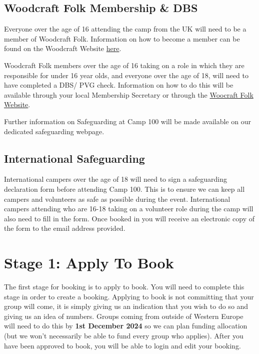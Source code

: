 \documentclass[a4paper, 11pt]{report}
\begin{document}
\section{Woodcraft Folk Membership \& DBS}
Everyone over the age of 16 attending the camp from the UK will need to be a member of Woodcraft Folk. Information on how to become a member can be found on the Woodcraft Website \href{https://woodcraft.org.uk/get-involved/volunteering-with-woodcraft-folk/}{here}.

Woodcraft Folk members over the age of 16 taking on a role in which they are responsible for under 16 year olds, and everyone over the age of 18, will need to have completed a DBS/ PVG check. Information on how to do this will be available through your local Membership Secretary or through the \href{https://woodcraft.org.uk/get-involved/volunteering-with-woodcraft-folk/}{Woocraft Folk Website}.

Further information on Safeguarding at Camp 100 will be made available on our dedicated safeguarding webpage. 

\section{International Safeguarding}
International campers over the age of 18 will need to sign a safeguarding declaration form before attending Camp 100. This is to ensure we can keep all campers and volunteers as safe as possible during the event. International campers attending who are 16-18 taking on a volunteer role during the camp will also need to fill in the form. Once booked in you will receive an electronic copy of the form to the email address provided. 


\chapter{Stage 1: Apply To Book}
\label{chap:apply}
The first stage for booking is to apply to book. You will need to complete this stage in order to create a booking. Applying to book is not committing that your group will come, it is simply giving us an indication that you wish to do so and giving us an idea of numbers. Groups coming from outside of Western Europe will need to do this by \textbf{1st December 2024} so we can plan funding allocation (but we won't necessarily be able to fund every group who applies). After you have been approved to book, you will be able to login and edit your booking.
\end{document}
